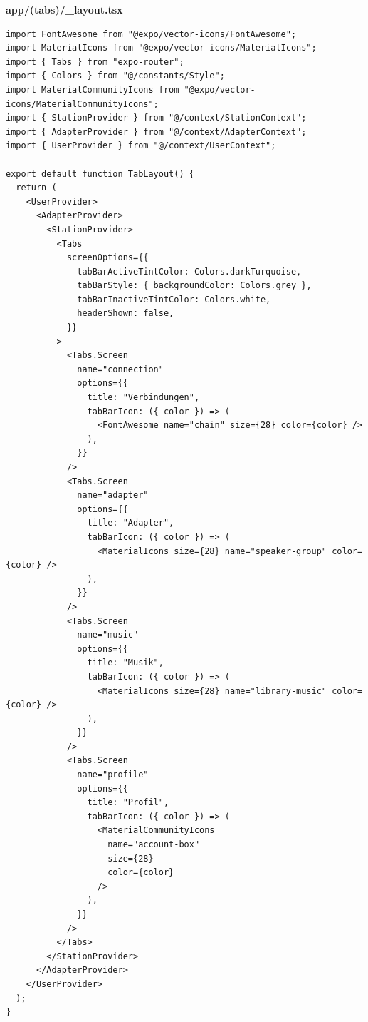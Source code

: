 \documentclass[11pt, twoside]{article}
\begin{document}
\textbf{app/(tabs)/\_layout.tsx}
\begin{lstlisting}
import FontAwesome from "@expo/vector-icons/FontAwesome";
import MaterialIcons from "@expo/vector-icons/MaterialIcons";
import { Tabs } from "expo-router";
import { Colors } from "@/constants/Style";
import MaterialCommunityIcons from "@expo/vector-icons/MaterialCommunityIcons";
import { StationProvider } from "@/context/StationContext";
import { AdapterProvider } from "@/context/AdapterContext";
import { UserProvider } from "@/context/UserContext";

export default function TabLayout() {
  return (
    <UserProvider>
      <AdapterProvider>
        <StationProvider>
          <Tabs
            screenOptions={{
              tabBarActiveTintColor: Colors.darkTurquoise,
              tabBarStyle: { backgroundColor: Colors.grey },
              tabBarInactiveTintColor: Colors.white,
              headerShown: false,
            }}
          >
            <Tabs.Screen
              name="connection"
              options={{
                title: "Verbindungen",
                tabBarIcon: ({ color }) => (
                  <FontAwesome name="chain" size={28} color={color} />
                ),
              }}
            />
            <Tabs.Screen
              name="adapter"
              options={{
                title: "Adapter",
                tabBarIcon: ({ color }) => (
                  <MaterialIcons size={28} name="speaker-group" color={color} />
                ),
              }}
            />
            <Tabs.Screen
              name="music"
              options={{
                title: "Musik",
                tabBarIcon: ({ color }) => (
                  <MaterialIcons size={28} name="library-music" color={color} />
                ),
              }}
            />
            <Tabs.Screen
              name="profile"
              options={{
                title: "Profil",
                tabBarIcon: ({ color }) => (
                  <MaterialCommunityIcons
                    name="account-box"
                    size={28}
                    color={color}
                  />
                ),
              }}
            />
          </Tabs>
        </StationProvider>
      </AdapterProvider>
    </UserProvider>
  );
}

\end{lstlisting}
\end{document}

